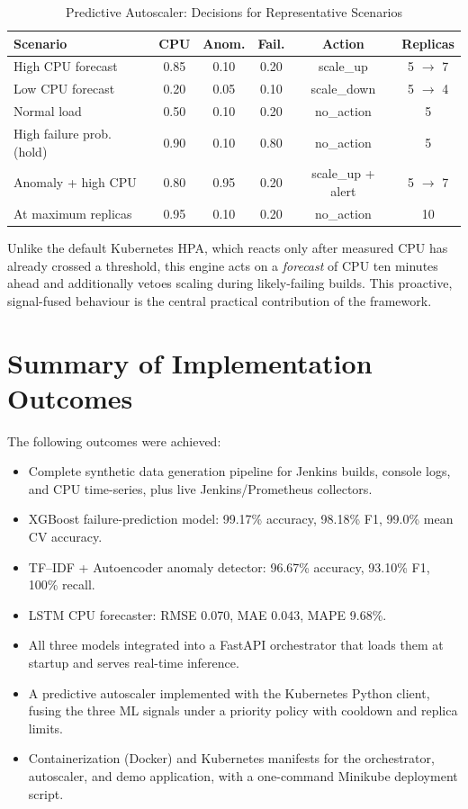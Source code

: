 \documentclass[a4paper,14pt,onecolumn]{report}
\begin{document}
\begin{table}[H]
\centering
\caption{Predictive Autoscaler: Decisions for Representative Scenarios}
\label{table:autoscale_results}
\begin{tabular}{|p{4.3cm}|c|c|c|c|c|}
\hline
\textbf{Scenario} & \textbf{CPU} & \textbf{Anom.} & \textbf{Fail.} & \textbf{Action} & \textbf{Replicas} \\
\hline
High CPU forecast & 0.85 & 0.10 & 0.20 & scale\_up & 5 $\rightarrow$ 7 \\
\hline
Low CPU forecast & 0.20 & 0.05 & 0.10 & scale\_down & 5 $\rightarrow$ 4 \\
\hline
Normal load & 0.50 & 0.10 & 0.20 & no\_action & 5 \\
\hline
High failure prob. (hold) & 0.90 & 0.10 & 0.80 & no\_action & 5 \\
\hline
Anomaly + high CPU & 0.80 & 0.95 & 0.20 & scale\_up + alert & 5 $\rightarrow$ 7 \\
\hline
At maximum replicas & 0.95 & 0.10 & 0.20 & no\_action & 10 \\
\hline
\end{tabular}
\end{table}

Unlike the default Kubernetes HPA, which reacts only after measured CPU has already crossed a threshold, this engine acts on a \emph{forecast} of CPU ten minutes ahead and additionally vetoes scaling during likely-failing builds. This proactive, signal-fused behaviour is the central practical contribution of the framework.

\section{Summary of Implementation Outcomes}

The following outcomes were achieved:

\begin{itemize}
    \item Complete synthetic data generation pipeline for Jenkins builds, console logs, and CPU time-series, plus live Jenkins/Prometheus collectors.
    \item XGBoost failure-prediction model: 99.17\% accuracy, 98.18\% F1, 99.0\% mean CV accuracy.
    \item TF--IDF + Autoencoder anomaly detector: 96.67\% accuracy, 93.10\% F1, 100\% recall.
    \item LSTM CPU forecaster: RMSE 0.070, MAE 0.043, MAPE 9.68\%.
    \item All three models integrated into a FastAPI orchestrator that loads them at startup and serves real-time inference.
    \item A predictive autoscaler implemented with the Kubernetes Python client, fusing the three ML signals under a priority policy with cooldown and replica limits.
    \item Containerization (Docker) and Kubernetes manifests for the orchestrator, autoscaler, and demo application, with a one-command Minikube deployment script.
\end{itemize}
\end{document}
